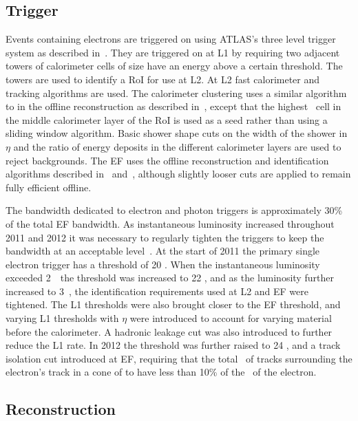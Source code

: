 \subsection{Trigger}
\label{sec:reco-el-triggers}

Events containing electrons are triggered on using ATLAS's three level trigger
system as described in~. They are triggered on at L1 by
requiring two adjacent towers of calorimeter cells of size
 have an energy above a certain threshold. The towers
are used to identify a RoI for use at L2. At L2 fast calorimeter and tracking
algorithms are used. The calorimeter clustering uses a similar algorithm to in
the offline reconstruction as described in~, except that the
highest \et\ cell in the middle calorimeter layer of the RoI is used as a seed
rather than using a sliding window algorithm. Basic shower shape cuts on
the width of the shower in $\eta$ and the ratio of energy deposits in the
different calorimeter layers are
used to reject backgrounds. The EF uses the offline reconstruction and
identification algorithms described in~
and~, although slightly looser cuts are applied to remain fully
efficient offline. 

The bandwidth dedicated to electron and photon triggers is approximately 30\% of the
total EF bandwidth. As instantaneous luminosity increased throughout 2011 and
2012 it was necessary to regularly tighten the triggers to keep the bandwidth at
an acceptable level~\cite{Monticelli:1450947}. At the start of 2011 the primary single electron trigger
has a threshold of 20 \gev. When the instantaneous luminosity exceeded
2~\instlumiunit\ the threshold was increased to 22 \gev, and as
the luminosity further increased to 3~\instlumiunit, the identification
requirements used at L2 and EF were tightened. The L1 thresholds were also
brought closer to the EF threshold, and varying L1 thresholds with $\eta$ were
introduced to account for varying material before the calorimeter. A hadronic
leakage cut was also introduced to further reduce the L1 rate. In 2012 the
threshold was further raised to 24 \gev, and a track isolation cut introduced at
EF, requiring that the total \pt\ of tracks surrounding the
electron's track in a cone of  to have less than 10\% of the \pt\ of
the electron.

\subsection{Reconstruction}
\label{sec:reco-el-reco}

